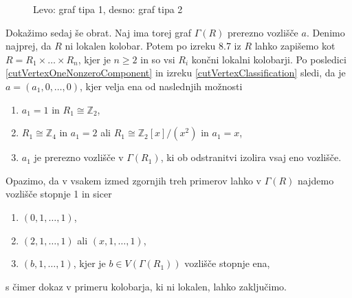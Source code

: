 \documentclass[a4paper, 12pt]{amsart}
\theoremstyle{definition} %
\theoremstyle{plain} %
\newcommand{\Z}{\mathbb Z}
\begin{document}
\begin{figure}[h!]
\centering
\caption{Levo: graf tipa 1, desno: graf tipa 2}
\label{tip1,2}
\end{figure}

Dokažimo sedaj še obrat. Naj ima torej graf $\Gamma(R)$ prerezno vozlišče $a$. Denimo najprej, da $R$ ni lokalen kolobar. Potem po izreku 8.7 iz \cite{Atiyah} $R$ lahko zapišemo kot $R=R_1 \times \dots \times R_n$, kjer je $n\ge 2$ in so vsi $R_i$ končni lokalni kolobarji. Po posledici \ref{cutVertexOneNonzeroComponent} in  izreku \ref{cutVertexClassification} sledi, da je $a = (a_1,0,\dots,0)$, kjer velja ena od naslednjih možnosti
\begin{enumerate}
\item $a_1 = 1$ in $R_1\cong \Z_2$,
\item $R_1 \cong \Z_4$ in $a_1 = 2$ ali $R_1 \cong \Z_2[x] / (x^2)$ in $a_1 = x$,
\item $a_1$ je prerezno vozlišče v $\Gamma(R_1)$, ki ob odstranitvi izolira vsaj eno vozlišče.
\end{enumerate}
Opazimo, da v vsakem izmed zgornjih treh primerov lahko v $\Gamma(R)$ najdemo vozlišče stopnje 1 in sicer 
\begin{enumerate}
\item $(0,1,\dots,1)$,
\item $(2,1,\dots,1)$ ali $(x,1,\dots,1)$,
\item $(b,1,\dots,1)$, kjer je $b\in V(\Gamma(R_1))$ vozlišče stopnje ena,
\end{enumerate}
s čimer dokaz v primeru kolobarja, ki ni lokalen, lahko zaključimo. 
\end{document}
